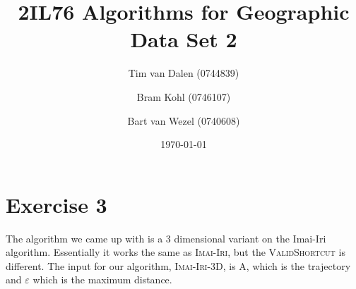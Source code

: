 \documentclass[a4paper,11pt]{article}
\title{
	2IL76 Algorithms for Geographic Data Set 2 \\
}
\author{
	Tim van Dalen (0744839)
	\and
	Bram Kohl (0746107)
	\and
	Bart van Wezel (0740608)
}
\date{\today}
\begin{document}
	\maketitle
	
\section*{Exercise 3}
The algorithm we came up with is a 3 dimensional variant on the Imai-Iri algorithm. Essentially it works the same as \textsc{Imai-Iri}, but the \textsc{ValidShortcut} is different. The input for our algorithm, \textsc{Imai-Iri-3D}, is A, which is the trajectory and $\varepsilon$ which is the maximum distance.


\end{document}

